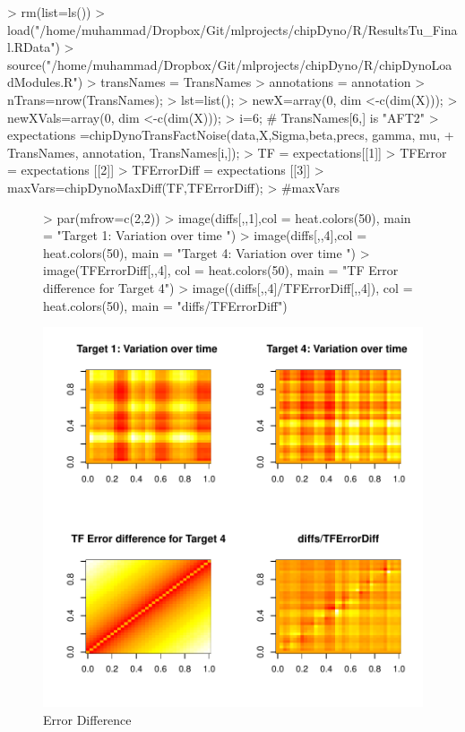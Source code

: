 \documentclass{article}
\begin{document}
\begin{Schunk}
\begin{Sinput}
> rm(list=ls())
> load("/home/muhammad/Dropbox/Git/mlprojects/chipDyno/R/ResultsTu_Final.RData")
> source("/home/muhammad/Dropbox/Git/mlprojects/chipDyno/R/chipDynoLoadModules.R")
> transNames = TransNames
> annotations = annotation
> nTrans=nrow(TransNames);
> lst=list();
> newX=array(0, dim <-c(dim(X)));
> newXVals=array(0, dim <-c(dim(X)));
> i=6; # TransNames[6,] is "AFT2"
> expectations =chipDynoTransFactNoise(data,X,Sigma,beta,precs, gamma, mu, 
+   					TransNames, annotation, TransNames[i,]);
> TF = expectations[[1]]
> TFError = expectations [[2]]
> TFErrorDiff = expectations [[3]]
> maxVars=chipDynoMaxDiff(TF,TFErrorDiff);
> #maxVars
\end{Sinput}
\end{Schunk}


\begin{figure}
\begin{Schunk}
\begin{Sinput}
> par(mfrow=c(2,2))
> image(diffs[,,1],col = heat.colors(50), main = "Target 1: Variation over time ")
> image(diffs[,,4],col = heat.colors(50), main = "Target 4: Variation over time ")
> image(TFErrorDiff[,,4], col = heat.colors(50), main = "TF Error difference for Target 4")
> image((diffs[,,4]/TFErrorDiff[,,4]), col = heat.colors(50), main = "diffs/TFErrorDiff")
\end{Sinput}
\end{Schunk}
\includegraphics{chipDyno-figure6}
\caption{Error Difference}
\label{Error_Diff}
\end{figure}
\end{document}
